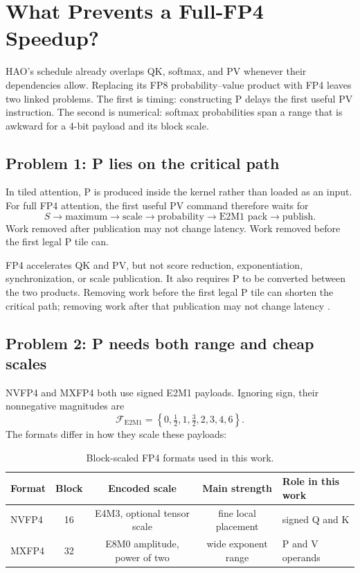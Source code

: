 \section{What Prevents a Full-FP4 Speedup?}
\label{sec:forward-problems}

HAO's schedule already overlaps QK, softmax, and PV whenever their
dependencies allow.  Replacing its FP8 probability--value product with FP4
leaves two linked problems.  The first is timing: constructing P delays the
first useful PV instruction.  The second is numerical: softmax probabilities
span a range that is awkward for a 4-bit payload and its block scale.

\subsection{Problem 1: P lies on the critical path}

In tiled attention, P is produced inside the kernel rather than loaded as an
input.  For full FP4 attention, the first useful PV command therefore waits
for
\begin{equation}
  S\rightarrow\text{maximum}\rightarrow\text{scale}
  \rightarrow\text{probability}\rightarrow\text{E2M1 pack}
  \rightarrow\text{publish}.
  \label{eq:serial-p-path}
\end{equation}
Work removed after publication may not change latency. Work removed before
the first legal P tile can.

FP4 accelerates QK and PV, but not score reduction, exponentiation,
synchronization, or scale publication.  It also requires P to be converted
between the two products.  Removing work before the first legal P tile can
shorten the critical path; removing work after that publication may not
change latency \cite{nvidia2026ptx,zadouri2026flashattention4}.

\subsection{Problem 2: P needs both range and cheap scales}

NVFP4 and MXFP4 both use signed E2M1 payloads.  Ignoring sign, their
nonnegative magnitudes are
\begin{equation}
  \mathcal F_{\mathrm{E2M1}}=
  \left\{0,\tfrac12,1,\tfrac32,2,3,4,6\right\}.
\end{equation}
The formats differ in how they scale these payloads:
\begin{table}[H]
\centering
\caption{Block-scaled FP4 formats used in this work.}
\label{tab:fp4-formats}
\small
\begin{tabularx}{\textwidth}{lcccX}
\toprule
Format & Block & Encoded scale & Main strength & Role in this work \\
\midrule
NVFP4 & 16 & E4M3, optional tensor scale & fine local placement & signed Q and K \\
MXFP4 & 32 & E8M0 amplitude, power of two & wide exponent range & P and V operands \\
\bottomrule
\end{tabularx}
\end{table}

